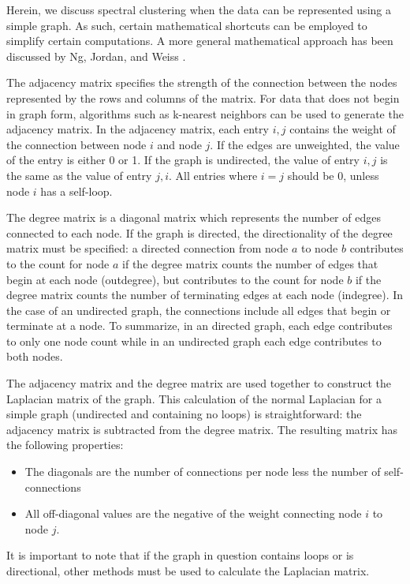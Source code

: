 Herein, we discuss spectral clustering when the data can be represented using a simple graph. As such, certain mathematical shortcuts can be employed to simplify certain computations. A more general mathematical approach has been discussed by Ng, Jordan, and Weiss \cite{Ng2002}.

The adjacency matrix specifies the strength of the connection between the nodes represented by the rows and columns of the matrix. For data that does not begin in graph form, algorithms such as k-nearest neighbors can be used to generate the adjacency matrix. In the adjacency matrix, each entry $i, j$ contains the weight of the connection between node $i$ and node $j$. If the edges are unweighted, the value of the entry is either 0 or 1. If the graph is undirected, the value of entry $i, j$ is the same as the value of entry $j, i$. All entries where $i=j$ should be 0, unless node $i$ has a self-loop.

The degree matrix is a diagonal matrix which represents the number of edges connected to each node. If the graph is directed, the directionality of the degree matrix must be specified: a directed connection from node $a$ to node $b$ contributes to the count for node $a$ if the degree matrix counts the number of edges that begin at each node (outdegree), but contributes to the count for node $b$ if the degree matrix counts the number of terminating edges at each node (indegree). In the case of an undirected graph, the connections include all edges that begin or terminate at a node. To summarize, in an directed graph, each edge contributes to only one node count while in an undirected graph each edge contributes to both nodes.

The adjacency matrix and the degree matrix are used together to construct the Laplacian matrix of the graph. This calculation of the normal Laplacian for a simple graph (undirected and containing no loops) is straightforward: the adjacency matrix is subtracted from the degree matrix. The resulting matrix has the following properties:
\begin{itemize}
\item The diagonals are the number of connections per node less the number of self-connections
\item All off-diagonal values are the negative of the weight connecting node $i$ to node $j$.
\end{itemize}
It is important to note that if the graph in question contains loops or is directional, other methods must be used to calculate the Laplacian matrix. 

